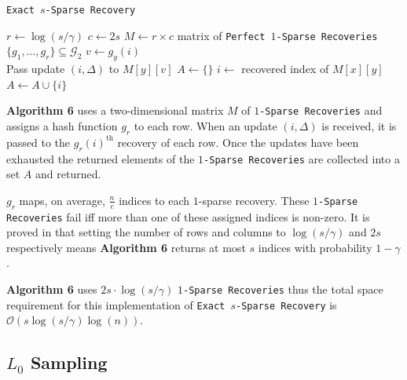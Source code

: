 \documentclass[11pt,twoside,a4paper]{report}
\begin{document}
\begin{algorithm}
	\caption{\texttt{Exact $s$-Sparse Recovery}}
	$r\leftarrow\log(s/\gamma)$
	$c\leftarrow2s$
	$M\leftarrow$$r\times c$ matrix of \texttt{Perfect $1$-Sparse Recoveries}\\
	$\{g_1,\dots,g_r\}\subseteq\mathcal{G}_2$
	 {
		 {
			$v\leftarrow g_y(i)$\\
			Pass update $(i,\Delta)$ to $M[y][v]$
		}
	}
	$A\leftarrow\{\}$
	 {
		 {
			$i\leftarrow$ recovered index of $M[x][y]$\\
			 {$A\leftarrow A\cup\{i\}$}
		}
	}
\end{algorithm}

\par \textbf{Algorithm 6} uses a two-dimensional matrix $M$ of \texttt{$1$-Sparse Recoveries} and assigns a hash function $g_r$ to each row. When an update $(i,\Delta)$ is received, it is passed to the $g_r(i)^\text{th}$ recovery of each row.
Once the updates have been exhausted the returned elements of the \texttt{$1$-Sparse Recoveries} are collected into a set $A$ and returned.
\par $g_r$ maps, on average, $\frac{n}c$ indices to each $1$-sparse recovery. These \texttt{$1$-Sparse Recoveries} fail iff more than one of these assigned indices is non-zero. It is proved in \cite{L0Framework} that setting the number of rows and columns to $\log(s/\gamma)$ and $2s$ respectively means \textbf{Algorithm 6} returns at most $s$ indices with probability $1-\gamma$.

\par \textbf{Algorithm 6} uses $2s\cdot\log(s/\gamma)$ \texttt{$1$-Sparse Recoveries} thus the total space requirement for this implementation of \texttt{Exact $s$-Sparse Recovery} is $\mathcal{O}(s\log(s/\gamma)\log(n))$.

\subsection{$L_0$ Sampling}
\end{document}
